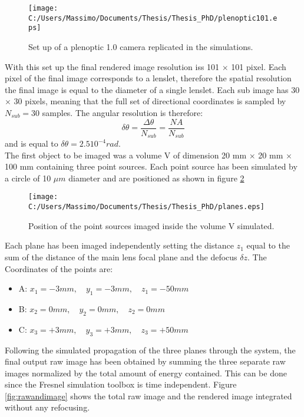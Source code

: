 \begin{figure}[H]
	\centering
	\texttt{[image: C:/Users/Massimo/Documents/Thesis/Thesis\_PhD/plenoptic101.eps]}
	\caption{\label{fig:pleno10_system2} Set up of a plenoptic 1.0 camera replicated in the simulations. }
\end{figure}		
With this set up the final rendered image resolution iss 101 $\times$ 101 pixel. Each pixel of the final image corresponds to a lenslet, therefore the spatial resolution the final image is equal to the diameter of a single lenslet. Each sub image has 30 $\times$ 30 pixels, meaning that the full set of directional coordinates is sampled by $N_{sub}=30$ samples. The angular resolution is therefore:
\begin{equation}
\label{eq:angularres}
\delta\theta = \dfrac{\Delta\theta}{N_{sub}}=\dfrac{NA}{N_{sub}}
\end{equation}
and is equal to $\delta\theta = 2.5 10^{-4} rad$.\\
The first object to be imaged was a volume V of dimension 20 mm $\times$ 20 mm $\times$ 100 mm containing three point sources. Each point source has been simulated by a circle of 10 $\mu m$ diameter and are positioned as shown in figure \ref{fig:volumepoint}
\begin{figure}[H]
	\centering
	\texttt{[image: C:/Users/Massimo/Documents/Thesis/Thesis\_PhD/planes.eps]}
	\caption{\label{fig:volumepoint} Position of the point sources imaged inside the volume V simulated. }
\end{figure}
Each plane has been imaged independently setting the distance $z_1$ equal to the sum of the distance of the main lens focal plane and the defocus $\delta z$. The Coordinates of the points are: 
\begin{itemize}
	\item A: $x_1 = -3 mm , \quad y_1 = -3 mm , \quad z_1 = -50 mm$
	\item B: $x_2 = 0 mm, \quad y_2 = 0 mm, \quad z_2 = 0 mm$ 
	\item C: $x_3 = +3 mm , \quad y_3 = +3 mm, \quad z_3 = +50 mm$
	\end{itemize} 
Following the simulated propagation of the three planes through the system, the final output raw image has been obtained by summing the three separate raw images normalized by the total amount of energy contained. This can be done since the Fresnel simulation toolbox is time independent. Figure \ref{fig:rawandimage} shows the total raw image and the rendered image integrated without any refocusing.
